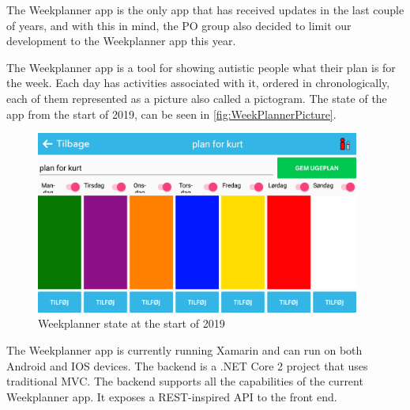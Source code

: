 The Weekplanner app is the only app that has received updates in the last couple of years, and with this in mind, the \gls{PO} group also decided to limit our development to the Weekplanner app this year.

The Weekplanner app is a tool for showing autistic people what their plan is for the week. Each day has activities associated with it, ordered in chronologically, each of them represented as a picture also called a pictogram. The state of the app from the start of 2019, can be seen in \autoref{fig:WeekPlannerPicture}.

\begin{figure}[ht]
        \begin{center}
            \includegraphics[width=0.95\textwidth]{figures/WeekPlannerPicture}
        \end{center}
        \caption{Weekplanner state at the start of 2019}
        \label{fig:WeekPlannerPicture}
\end{figure}

The Weekplanner app is currently running Xamarin and can run on both Android and IOS devices.
The backend is a .NET Core 2 project that uses traditional MVC. The backend supports all the capabilities of the current Weekplanner app. It exposes a REST-inspired API to the front end.